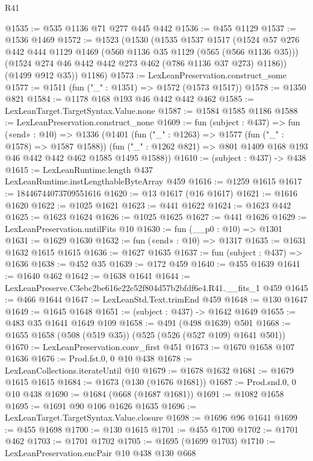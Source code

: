 \begin{lexlean}{R41}
\begin{coremodule}
@1535 := @535 @1136 @71 @277 @445 @442
@1536 := @455 @1129
@1537 := @1536 @1469
@1572 := @1523
    (@1530
      (@1535
        @1537
        @1517
        (@1524
          @57
          @276
          @442
          @444
          @1129
          @1469
          (@560 @1136 @35 @1129 (@565 (@566 @1136 @35)))
          (@1524 @274 @46 @442 @442 @273 @462 (@786 @1136 @37 @273) @1186))
        (@1499 @912 @35))
      @1186)
@1573 := LexLeanPreservation.construct_some
@1577 := @1511 (fun ("_" : @1351) => @1572 (@1573 @1517))
@1578 := @1350 @821
@1584 := @1178 @168 @193 @46 @442 @442 @462
@1585 := LexLeanTarget.TargetSyntax.Value.none
@1587 := @1584 @1585 @1186
@1588 := LexLeanPreservation.construct_none
@1609 := fun (subject : @437) =>
  fun («end» : @10) =>
  @1336
    (@1401
      (fun ("_" : @1263) => @1577 (fun ("_" : @1578) => @1587 @1588))
      (fun ("_" : @1262 @821) => @801 @1409 @168 @193 @46 @442 @442 @462 @1585 @1495 @1588))
@1610 := (subject : @437) -> @438
@1615 := LexLeanRuntime.length @437 LexLeanRuntime.instLengthableByteArray @459
@1616 := @1259 @1615
@1617 := 18446744073709551616
@1620 := @13 @1617 (@16 @1617)
@1621 := @1616 @1620
@1622 := @1025 @1621
@1623 := @441 @1622
@1624 := @1623 @442
@1625 := @1623 @1624
@1626 := @1025 @1625
@1627 := @441 @1626
@1629 := LexLeanPreservation.untilFits @10
@1630 := fun (__p0 : @10) => @1301
@1631 := @1629 @1630
@1632 := fun («end» : @10) => @1317
@1635 := @1631 @1632 @1615 @1615
@1636 := @1627 @1635
@1637 := fun (subject : @437) => @1636
@1638 := @452 @35
@1639 := @172 @459
@1640 := @455 @1639
@1641 := @1640 @462
@1642 := @1638 @1641
@1644 := LexLeanPreserve.C3ebc2be616e22c52f804d57b2bfdf6e4.R41.__fits_1 @459
@1645 := @466 @1644
@1647 := LexLeanStd.Text.trimEnd @459
@1648 := @130 @1647
@1649 := @1645 @1648
@1651 := (subject : @437) -> @1642 @1649
@1655 := @483 @35 @1641 @1649 @109
@1658 := @491 (@498 @1639) @501
@1668 := @1655 @1658 (@508 (@519 @35)) (@525 (@526 (@527 @109) @1641 @501))
@1670 := LexLeanPreservation.conv_first @451
@1673 := @1670 @1658 @107 @1636
@1676 := Prod.fst.{0, 0} @10 @438
@1678 := LexLeanCollections.iterateUntil @10
@1679 := @1678 @1632
@1681 := @1679 @1615 @1615
@1684 := @1673 (@130 (@1676 @1681))
@1687 := Prod.snd.{0, 0} @10 @438
@1690 := @1684 (@668 (@1687 @1681))
@1691 := @1082 @1658
@1695 := @1691 @90 @106 @1626 @1635
@1696 := LexLeanTarget.TargetSyntax.Value.closure
@1698 := @1696 @96 @1641
@1699 := @455 @1698
@1700 := @130 @1615
@1701 := @455 @1700
@1702 := @1701 @462
@1703 := @1701 @1702
@1705 := @1695 (@1699 @1703)
@1710 := LexLeanPreservation.encPair @10 @438 @130 @668

\end{coremodule}
\end{lexlean}
